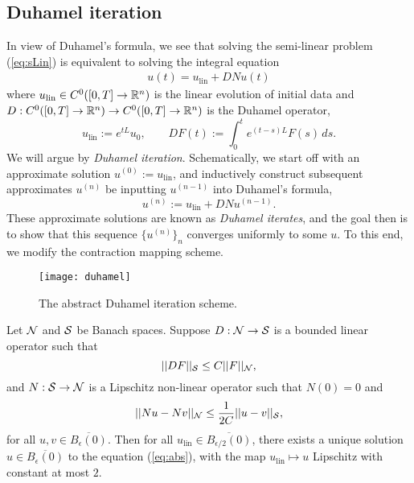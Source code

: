 \subsection{Duhamel iteration}

In view of Duhamel's formula, we see that solving the semi-linear problem (\ref{eq:sLin}) is equivalent to solving the integral equation 
	\begin{align}
		u(t) =  u_{\text{lin}} + DN u(t)
		\tag{sLin'} 
		\label{eq:abs}
	\end{align}	
where $u_{\text{lin}} \in C^0 ([0, T] \to \mathbb R^n)$ is the linear evolution of initial data and $D : C^0 ([0, T] \to \mathbb R^n) \to C^0 ([0, T] \to \mathbb R^n)$ is the Duhamel operator,
	\[ u_{\text{lin}} := e^{tL} u_0 ,\qquad DF (t) := \int_0^t e^{(t - s) L} F(s) \, ds. \]	
We will argue by \textit{Duhamel iteration}. Schematically, we start off with an approximate solution $u^{(0)} := u_{\text{lin}}$, and inductively construct subsequent approximates $u^{(n)}$ be inputting $u^{(n - 1)}$ into Duhamel's formula, 
	\[ u^{(n)} := u_{\text{lin}} + DN u^{(n - 1)}.  \]
These approximate solutions are known as \emph{Duhamel iterates}, and the goal then is to show that this sequence $\{u^{(n)}\}_n$ converges uniformly to some $u$. To this end, we modify the contraction mapping scheme.

	\begin{figure}[h]
		\begin{center}
			\texttt{[image: duhamel]}
			\caption{The abstract Duhamel iteration scheme.}
		\end{center}
	\end{figure}

\begin{lemma}
	Let $\mathcal N$ and $\mathcal S$ be Banach spaces. Suppose  $D: \mathcal N \to \mathcal S$ is a bounded linear operator such that
		\[ ||DF||_{\mathcal S} \leq C ||F||_{\mathcal N}, \]
	and	 $N : \mathcal S \to \mathcal N$ is a Lipschitz non-linear operator such that $N(0) = 0$ and 
		\[ ||Nu - Nv||_{\mathcal N} \leq \frac{1}{2C} ||u - v||_{\mathcal S}, \]
	for all $u, v \in \overline{B_\epsilon (0)}$. Then for all $u_{\text{lin}} \in \overline{B_{\epsilon/2} (0)}$, there exists a unique solution $u \in \overline{B_\epsilon (0)}$ to the equation (\ref{eq:abs}), with the map $u_{\text{lin}} \mapsto u$ Lipschitz with constant at most $2$.
\end{lemma}

